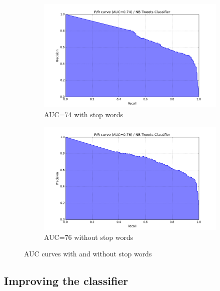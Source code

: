 \begin{figure}
  \centering
  \begin{subfigure}[b]{0.49\linewidth}
    \includegraphics[width=\linewidth]{Figures/pr_NB_Tweets_Classifier_01}
  \caption{AUC=74 with stop words}
  \label{fig:auc-with-stopwords}
  \end{subfigure}
  \begin{subfigure}[b]{0.49\linewidth}
      \includegraphics[width=\linewidth]{Figures/pr_NB_Tweets_Classifier_02}
  \caption{AUC=76 without stop words}
  \label{fig:auc-without-stopwords}
  \end{subfigure}
\caption{AUC curves with and without stop words}
\label{fig:auc-curves-stopwords}
\end{figure}



\subsection{Improving the classifier}

